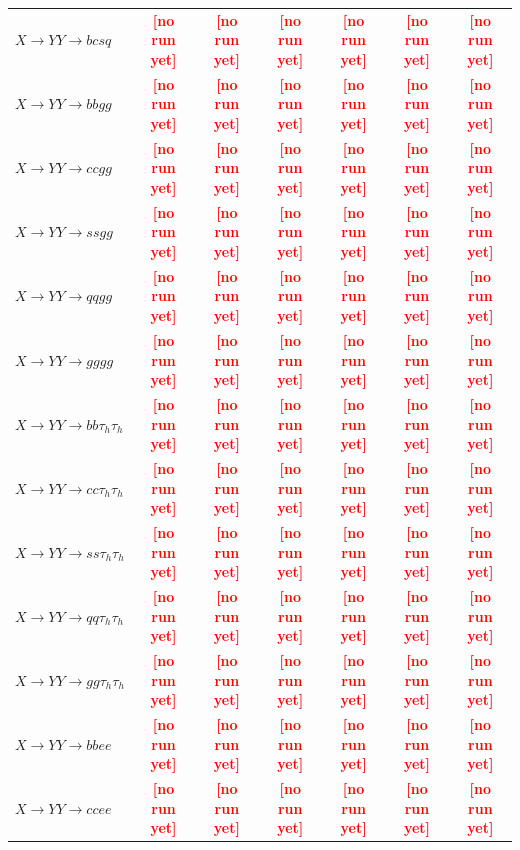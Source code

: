 \documentclass[12pt]{article}   %
\newcommand{\pending}[1]{\textcolor{red}{\textbf{[#1]}}}
\begin{document}
\begin{landscape}
{\begin{longtable}{@{\extracolsep{\fill}}lcccccc@{}}
$X\to YY\to bcsq$ & \pending{no run yet} & \pending{no run yet} & \pending{no run yet} & \pending{no run yet} & \pending{no run yet} & \pending{no run yet} \\
$X\to YY\to bbgg$ & \pending{no run yet} & \pending{no run yet} & \pending{no run yet} & \pending{no run yet} & \pending{no run yet} & \pending{no run yet} \\
$X\to YY\to ccgg$ & \pending{no run yet} & \pending{no run yet} & \pending{no run yet} & \pending{no run yet} & \pending{no run yet} & \pending{no run yet} \\
$X\to YY\to ssgg$ & \pending{no run yet} & \pending{no run yet} & \pending{no run yet} & \pending{no run yet} & \pending{no run yet} & \pending{no run yet} \\
$X\to YY\to qqgg$ & \pending{no run yet} & \pending{no run yet} & \pending{no run yet} & \pending{no run yet} & \pending{no run yet} & \pending{no run yet} \\
$X\to YY\to gggg$ & \pending{no run yet} & \pending{no run yet} & \pending{no run yet} & \pending{no run yet} & \pending{no run yet} & \pending{no run yet} \\
\midrule
$X\to YY\to bb\tau_h\tau_h$ & \pending{no run yet} & \pending{no run yet} & \pending{no run yet} & \pending{no run yet} & \pending{no run yet} & \pending{no run yet} \\
$X\to YY\to cc\tau_h\tau_h$ & \pending{no run yet} & \pending{no run yet} & \pending{no run yet} & \pending{no run yet} & \pending{no run yet} & \pending{no run yet} \\
$X\to YY\to ss\tau_h\tau_h$ & \pending{no run yet} & \pending{no run yet} & \pending{no run yet} & \pending{no run yet} & \pending{no run yet} & \pending{no run yet} \\
$X\to YY\to qq\tau_h\tau_h$ & \pending{no run yet} & \pending{no run yet} & \pending{no run yet} & \pending{no run yet} & \pending{no run yet} & \pending{no run yet} \\
$X\to YY\to gg\tau_h\tau_h$ & \pending{no run yet} & \pending{no run yet} & \pending{no run yet} & \pending{no run yet} & \pending{no run yet} & \pending{no run yet} \\
\midrule
$X\to YY\to bbee$ & \pending{no run yet} & \pending{no run yet} & \pending{no run yet} & \pending{no run yet} & \pending{no run yet} & \pending{no run yet} \\
$X\to YY\to ccee$ & \pending{no run yet} & \pending{no run yet} & \pending{no run yet} & \pending{no run yet} & \pending{no run yet} & \pending{no run yet} \\

\end{longtable}}
\end{landscape}
\end{document}
